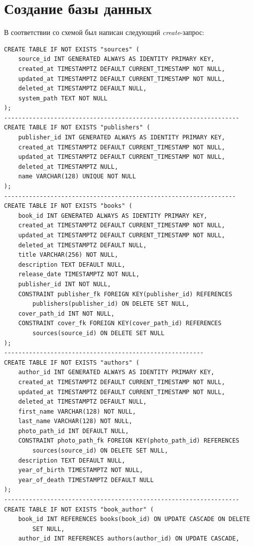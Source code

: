 \documentclass[a4paper,12pt]{article}
\begin{document}
\newpage
\section{Создание базы данных}
В соответствии со схемой был написан следующий \emph{create}-запрос:
\begin{lstlisting}
CREATE TABLE IF NOT EXISTS "sources" (
    source_id INT GENERATED ALWAYS AS IDENTITY PRIMARY KEY,
    created_at TIMESTAMPTZ DEFAULT CURRENT_TIMESTAMP NOT NULL,
    updated_at TIMESTAMPTZ DEFAULT CURRENT_TIMESTAMP NOT NULL,
    deleted_at TIMESTAMPTZ DEFAULT NULL,
    system_path TEXT NOT NULL
);
------------------------------------------------------------------
CREATE TABLE IF NOT EXISTS "publishers" (
    publisher_id INT GENERATED ALWAYS AS IDENTITY PRIMARY KEY,
    created_at TIMESTAMPTZ DEFAULT CURRENT_TIMESTAMP NOT NULL,
    updated_at TIMESTAMPTZ DEFAULT CURRENT_TIMESTAMP NOT NULL,
    deleted_at TIMESTAMPTZ NULL,
    name VARCHAR(128) UNIQUE NOT NULL
);
-----------------------------------------------------------------
CREATE TABLE IF NOT EXISTS "books" (
    book_id INT GENERATED ALWAYS AS IDENTITY PRIMARY KEY,
    created_at TIMESTAMPTZ DEFAULT CURRENT_TIMESTAMP NOT NULL,
    updated_at TIMESTAMPTZ DEFAULT CURRENT_TIMESTAMP NOT NULL,
    deleted_at TIMESTAMPTZ DEFAULT NULL,
    title VARCHAR(256) NOT NULL,
    description TEXT DEFAULT NULL,
    release_date TIMESTAMPTZ NOT NULL,
    publisher_id INT NOT NULL,
    CONSTRAINT publisher_fk FOREIGN KEY(publisher_id) REFERENCES
        publishers(publisher_id) ON DELETE SET NULL,
    cover_path_id INT NOT NULL,
    CONSTRAINT cover_fk FOREIGN KEY(cover_path_id) REFERENCES
        sources(source_id) ON DELETE SET NULL
);
--------------------------------------------------------
CREATE TABLE IF NOT EXISTS "authors" (
    author_id INT GENERATED ALWAYS AS IDENTITY PRIMARY KEY,
    created_at TIMESTAMPTZ DEFAULT CURRENT_TIMESTAMP NOT NULL,
    updated_at TIMESTAMPTZ DEFAULT CURRENT_TIMESTAMP NOT NULL,
    deleted_at TIMESTAMPTZ DEFAULT NULL,
    first_name VARCHAR(128) NOT NULL,
    last_name VARCHAR(128) NOT NULL,
    photo_path_id INT DEFAULT NULL,
    CONSTRAINT photo_path_fk FOREIGN KEY(photo_path_id) REFERENCES
        sources(source_id) ON DELETE SET NULL,
    description TEXT DEFAULT NULL,
    year_of_birth TIMESTAMPTZ NOT NULL,
    year_of_death TIMESTAMPTZ DEFAULT NULL
);
------------------------------------------------------------------
CREATE TABLE IF NOT EXISTS "book_author" (
    book_id INT REFERENCES books(book_id) ON UPDATE CASCADE ON DELETE 
        SET NULL,
    author_id INT REFERENCES authors(author_id) ON UPDATE CASCADE,

\end{lstlisting}
\end{document}
